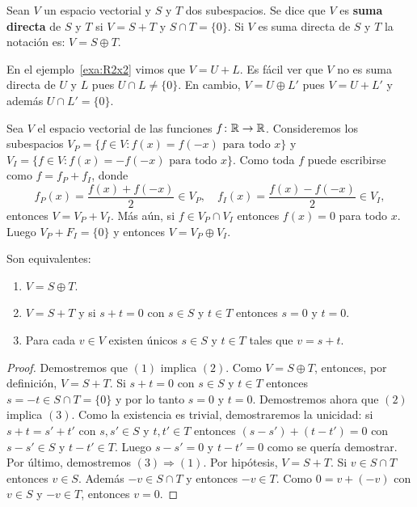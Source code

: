 \begin{block}
    Sean $V$ un espacio vectorial y $S$ y $T$ dos subespacios. Se dice que $V$
    es \textbf{suma directa} de $S$ y $T$ si $V=S+T$ y $S\cap T=\{0\}$.  Si $V$
    es suma directa de $S$ y $T$ la notación es: $V=S\oplus T$. 
\end{block}

\begin{example}
    En el ejemplo~\ref{exa:R2x2} vimos que $V=U+L$. Es fácil ver que $V$ no es
    suma directa de $U$ y $L$ pues $U\cap L\ne\{0\}$. En cambio, $V=U\oplus L'$
    pues $V=U+L'$ y además $U\cap L'=\{0\}$. 
\end{example}

\begin{example}
    Sea $V$ el espacio vectorial de las funciones $f\colon\mathbb{R}\to\mathbb{R}$.
    Consideremos los subespacios $V_P=\{f\in V:f(x)=f(-x)\text{ para todo
    $x$}\}$ y $V_I=\{f\in V: f(x)=-f(-x)\text{ para todo $x$}\}$. Como toda $f$
    puede escribirse como $f=f_P+f_I$, donde
	\[
	f_P(x)=\frac{f(x)+f(-x)}{2}\in V_P,\quad
	f_I(x)=\frac{f(x)-f(-x)}{2}\in V_I,
	\]
    entonces $V=V_P+V_I$. Más aún, si $f\in V_P\cap V_I$ entonces $f(x)=0$ para
    todo $x$. Luego $V_P+F_I=\{0\}$ y entonces $V=V_P\oplus V_I$.
\end{example}

\begin{prop}
    Son equivalentes:
    \begin{enumerate}
        \item $V=S\oplus T$.
		\item $V=S+T$ y si $s+t=0$ con $s\in S$ y $t\in T$ entonces $s=0$ y
			$t=0$.
		\item Para cada $v\in V$ existen únicos $s\in S$ y $t\in T$ tales que
			$v=s+t$.
    \end{enumerate}

    \begin{proof}
		Demostremos que $(1)$ implica $(2)$. Como $V=S\oplus T$, entonces, por definición, 
	    $V=S+T$. Si $s+t=0$ con $s\in S$ y $t\in T$ entonces
		$s=-t\in S\cap T=\{0\}$ y por lo tanto $s=0$ y $t=0$. Demostremos ahora
		que $(2)$ implica $(3)$. Como la existencia es trivial, demostraremos
		la unicidad: si $s+t=s'+t'$ con $s,s'\in S$ y $t,t'\in T$ entonces
		$(s-s')+(t-t')=0$ con $s-s'\in S$ y $t-t'\in T$. Luego $s-s'=0$ y
		$t-t'=0$ como se quería demostrar. Por último, demostremos
		$(3)\Rightarrow(1)$. Por hipótesis, $V=S+T$. Si $v\in S\cap T$ entonces
		$v\in S$.  Además $-v\in S\cap T$ y entonces $-v\in T$. Como $0=v+(-v)$
		con $v\in S$ y $-v\in T$, entonces $v=0$.
    \end{proof}
\end{prop}


